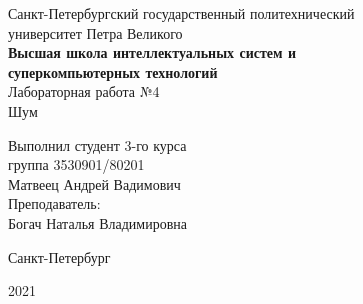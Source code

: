 \documentclass[a4paper]{article}
\begin{document}
    \begin{center}
        \begin{center}
        \hfill \break
        \normalsize{Санкт-Петербургский государственный политехнический}\\
        \normalsize{университет Петра Великого}\\
        \hfill \break
        \normalsize{\textbf{Высшая школа интеллектуальных систем и}}\\ 
        \normalsize{\textbf{суперкомпьютерных технологий}}\\ 
        \hfill \break
        \hfill \break
        \hfill \break
        \normalsize{Лабораторная работа №4}\\
        \hfill \break
        \hfill \break
        \normalsize{\LARGE Шум}\\
        \end{center}
        \hfill \break
        \hfill \break
        \hfill \break
        \hfill \break
        \hfill \break
        \hfill \break
        \hfill \break
        \hfill \break
        \hfill \break
        \hfill \break
        \begin{flushright}
            \normalsize{Выполнил студент 3-го курса}\\
            \normalsize{группа 3530901/80201}\\
            \normalsize{Матвеец Андрей Вадимович}\\
            \hfill \break
            \normalsize{Преподаватель:}\\
            \normalsize{Богач Наталья Владимировна}\\
        \end{flushright}
        \hfill \break
        \hfill \break
        \hfill \break
        \hfill \break
        \begin{center} Санкт-Петербург\end{center}
        \begin{center}2021\end{center} 
        \thispagestyle{empty}
    \end{center}
    
    \newpage
        \tableofcontents
    
    \newpage
         \listoffigures
    
    \newpage
         \lstlistoflistings   
     
\end{document}
